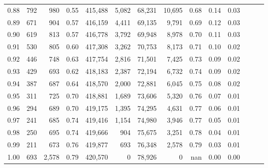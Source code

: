 \begin{tabular}{rrrrrrrrrrrrrr}
0.88 &     792 &    980 &  0.55 &  415,488 &    5,082 &  68,231 &  10,695 &  0.68 &  0.14 &      0.03 \\
0.89 &     671 &    904 &  0.57 &  416,159 &    4,411 &  69,135 &   9,791 &  0.69 &  0.12 &      0.03 \\
0.90 &     619 &    813 &  0.57 &  416,778 &    3,792 &  69,948 &   8,978 &  0.70 &  0.11 &      0.03 \\
0.91 &     530 &    805 &  0.60 &  417,308 &    3,262 &  70,753 &   8,173 &  0.71 &  0.10 &      0.02 \\
0.92 &     446 &    748 &  0.63 &  417,754 &    2,816 &  71,501 &   7,425 &  0.73 &  0.09 &      0.02 \\
0.93 &     429 &    693 &  0.62 &  418,183 &    2,387 &  72,194 &   6,732 &  0.74 &  0.09 &      0.02 \\
0.94 &     387 &    687 &  0.64 &  418,570 &    2,000 &  72,881 &   6,045 &  0.75 &  0.08 &      0.02 \\
0.95 &     311 &    725 &  0.70 &  418,881 &    1,689 &  73,606 &   5,320 &  0.76 &  0.07 &      0.01 \\
0.96 &     294 &    689 &  0.70 &  419,175 &    1,395 &  74,295 &   4,631 &  0.77 &  0.06 &      0.01 \\
0.97 &     241 &    685 &  0.74 &  419,416 &    1,154 &  74,980 &   3,946 &  0.77 &  0.05 &      0.01 \\
0.98 &     250 &    695 &  0.74 &  419,666 &      904 &  75,675 &   3,251 &  0.78 &  0.04 &      0.01 \\
0.99 &     211 &    673 &  0.76 &  419,877 &      693 &  76,348 &   2,578 &  0.79 &  0.03 &      0.01 \\
1.00 &     693 &  2,578 &  0.79 &  420,570 &        0 &  78,926 &       0 &   nan &  0.00 &      0.00 \\
\bottomrule
\end{tabular}
